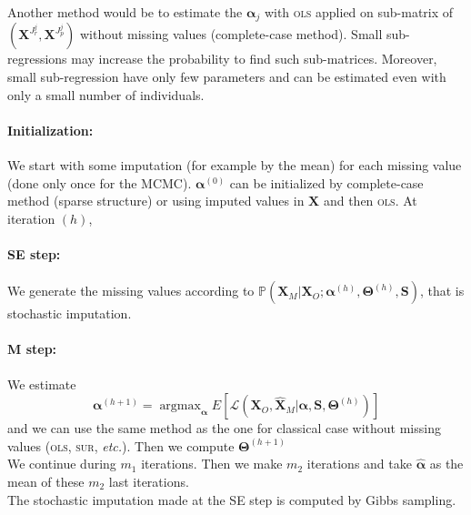 \documentclass[12pt,a4paper]{report}
\begin{document}
	Another method would be to estimate the $\boldsymbol{\alpha}_j$ with \textsc{ols} applied on sub-matrix of $(\boldsymbol{X}^{J_r^j},\boldsymbol{X}^{J_p^j})$ without missing values (complete-case method). Small sub-regressions may increase the probability to find such sub-matrices. Moreover, small sub-regression have only few parameters and can be estimated even with only a small number of individuals.
		
	
	\paragraph{Initialization:} We start with some imputation (for example by the mean) for each missing value (done only once for the MCMC). $\boldsymbol{\alpha}^{(0)}$ can be initialized by complete-case method	(sparse structure) or using imputed values in $\boldsymbol{X}$ and then \textsc{ols}.
	At iteration $(h)$,
	\paragraph{SE step:}
		We generate the missing values according to $\mathbb{P}(\boldsymbol{X}_M|\boldsymbol{X}_O; \boldsymbol{\alpha}^{(h)},\boldsymbol{\Theta}^{(h)},\boldsymbol{S})$, that is stochastic imputation.
	\paragraph{M step:}
		We estimate 
		\begin{equation}
	\boldsymbol{\alpha}^{(h+1)}=\operatorname{argmax}_{\boldsymbol{\alpha}}E\left[\mathcal{L}(\boldsymbol{X}_O,\hat{\boldsymbol{X}}_M|\boldsymbol{\alpha},\boldsymbol{S},\boldsymbol{\Theta}^{(h)}) \right]  \nonumber 
\end{equation}
and we can use the same method as the one for classical case without missing values (\textsc{ols}, \textsc{sur}, {\it etc.}). Then we compute $\boldsymbol{\Theta}^{(h+1)}$ \\

		We continue during $m_1$ iterations. Then we make $m_2$ iterations and take $\hat{\boldsymbol{\alpha}}$ as the mean of these $m_2$ last iterations.\\
		
	The stochastic imputation made at the SE step is computed by Gibbs sampling.
\end{document}
